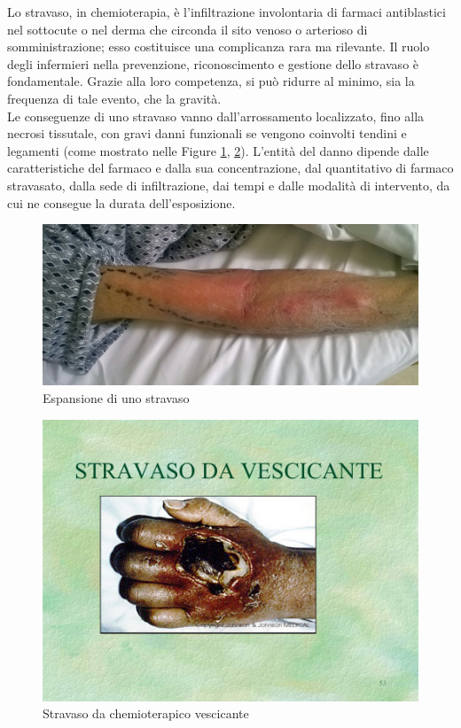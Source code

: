 Lo stravaso, in chemioterapia, è l’infiltrazione involontaria di farmaci antiblastici nel sottocute o nel derma che 
circonda il sito venoso o arterioso di somministrazione; esso costituisce una complicanza rara ma rilevante.
Il ruolo degli infermieri nella prevenzione, riconoscimento e gestione dello stravaso è fondamentale. Grazie alla 
loro competenza, si può ridurre al minimo, sia la frequenza di tale evento, che la gravità.\\ Le conseguenze di uno 
stravaso vanno dall’arrossamento localizzato, fino alla necrosi tissutale, con gravi danni funzionali se vengono 
coinvolti tendini e legamenti (come mostrato nelle Figure \ref{fig:FIGURE_4.18}, \ref{fig:FIGURE_4.19}). 
L’entità del danno dipende dalle caratteristiche del farmaco e dalla sua 
concentrazione, dal quantitativo di farmaco stravasato, dalla sede di infiltrazione, dai tempi e dalle modalità 
di intervento, da cui ne consegue la durata dell’esposizione\cite{STRAVASOTOSCANA}.\\

\begin{figure}[H]
    \begin{center}
    \includegraphics[width=0.6\columnwidth]{img/stravaso.jpeg}
    \vspace{-3mm}
    \end{center}
    \caption{Espansione di uno stravaso
    \cite{STRAVASONURSE}}
    \label{fig:FIGURE_4.18}
\end{figure}

\begin{figure}[H]
    \begin{center}
    \includegraphics[width=0.4\columnwidth]{img/STRAVASOVESCICANTE.jpeg}
    \vspace{-3mm}
    \end{center}
    \caption{Stravaso da chemioterapico vescicante
    \cite{STRAVASONURSE}}
    \label{fig:FIGURE_4.19}
\end{figure}

